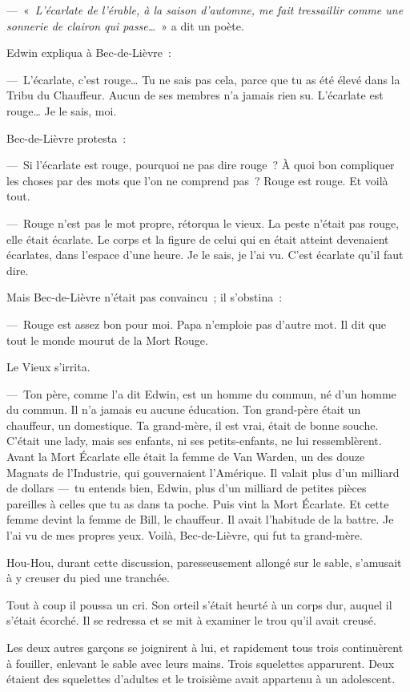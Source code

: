 \documentclass[french,twoside]{book} %
\begin{document}
— « \emph{L’écarlate de l’érable, à la saison d’automne, me fait tressaillir comme une sonnerie de clairon qui passe…} » a dit un poète.\par
Edwin expliqua à Bec-de-Lièvre :\par
— L’écarlate, c’est rouge… Tu ne sais pas cela, parce que tu as été élevé dans la Tribu du Chauffeur. Aucun de ses membres n’a jamais rien su. L’écarlate est rouge… Je le sais, moi.\par
Bec-de-Lièvre protesta :\par
— Si l’écarlate est rouge, pourquoi ne pas dire rouge ? À quoi bon compliquer les choses par des mots que l’on ne comprend pas ? Rouge est rouge. Et voilà tout.\par
— Rouge n’est pas le mot propre, rétorqua le vieux. La peste n’était pas rouge, elle était écarlate. Le corps et la figure de celui qui en était atteint devenaient écarlates, dans l’espace d’une heure. Je le sais, je l’ai vu. C’est écarlate qu’il faut dire.\par
Mais Bec-de-Lièvre n’était pas convaincu ; il s’obstina :\par
— Rouge est assez bon pour moi. Papa n’emploie pas d’autre mot. Il dit que tout le monde mourut de la Mort Rouge.\par
Le Vieux s’irrita.\par
— Ton père, comme l’a dit Edwin, est un homme du commun, né d’un homme du commun. Il n’a jamais eu aucune éducation. Ton grand-père était un chauffeur, un domestique. Ta grand-mère, il est vrai, était de bonne souche. C’était une lady, mais ses enfants, ni ses petits-enfants, ne lui ressemblèrent. Avant la Mort Écarlate elle était la femme de Van Warden, un des douze Magnats de l’Industrie, qui gouvernaient l’Amérique. Il valait plus d’un milliard de dollars — tu entends bien, Edwin, plus d’un milliard de petites pièces pareilles à celles que tu as dans ta poche. Puis vint la Mort Écarlate. Et cette femme devint la femme de Bill, le chauffeur. Il avait l’habitude de la battre. Je l’ai vu de mes propres yeux. Voilà, Bec-de-Lièvre, qui fut ta grand-mère.\par
Hou-Hou, durant cette discussion, paresseusement allongé sur le sable, s’amusait à y creuser du pied une tranchée.\par
Tout à coup il poussa un cri. Son orteil s’était heurté à un corps dur, auquel il s’était écorché. Il se redressa et se mit à examiner le trou qu’il avait creusé.\par
Les deux autres garçons se joignirent à lui, et rapidement tous trois continuèrent à fouiller, enlevant le sable avec leurs mains. Trois squelettes apparurent. Deux étaient des squelettes d’adultes et le troisième avait appartenu à un adolescent.\par
\end{document}
